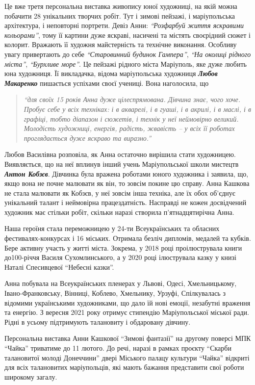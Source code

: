 
Це вже третя персональна виставка живопису юної художниці, на якій можна
побачити 28 унікальних творчих робіт. Тут і зимові пейзажі, і маріупольська
архітектура, і неповторні портрети. Девіз Анни: \emph{\enquote{Розфарбуй життя
яскравими кольорами}}, тому її картини дуже яскраві, насичені та містять
своєрідний сюжет і колорит. Вражають її художня майстерність та технічне
виконання. Особливу увагу привертають до себе \emph{\enquote{Старовинний
будинок Гампера}}, \emph{\enquote{На околиці рідного міста}},
\emph{\enquote{Бурхливе море}}. Це пейзажі рідного міста Маріуполь, яке дуже
любить юна художниця.  Її викладачка, відома маріупольська художниця
\emph{\textbf{Любов Макаренко}} пишається успіхами своєї учениці. Вона
наголосила, що

\begin{quote}
\em\enquote{для своїх 15 років Анна
дуже цілеспрямована. Дівчина знає, чого хоче. Пробує себе у всіх техніках: і в
акварелі, і в гуаші, і в акрилі, і в маслі, і в графіці, тобто діапазон і
сюжетів, і технік у неї неймовірно великий. Молодість художниці, енергія,
радість, жвавість – у всіх її роботах проглядається дуже яскраво та виразно.}
\end{quote}

Любов Василівна розповіла, як Анна остаточно вирішила стати художницею.
Виявляється, що на неї вплинув інший учень Маріупольської школи мистецтв \emph{\textbf{Антон
Кобзєв}}. Дівчинка була вражена роботами юного художника і заявила, що, якщо вона
не почне малювати як він, то зовсім покине цю справу. Анна Кашкова не стала
малювати як Кобзєв, у неї зовсім інша техніка, але їх обох об'єднує унікальний
талант і неймовірна працездатність. Насправді не кожен досвідчений художник має
стільки робіт, скільки наразі створила п'ятнадцятирічна Анна.


Наша героїня стала переможницею у 24-ти Всеукраїнських та обласних
фестивалях-конкурсах і 16 міських. Отримала безліч дипломів, медалей та кубків.
Бере активну участь у житті міста. Зокрема, у 2018 році проілюструвала книги
до100-річчя Василя Сухомлинського, а у 2020 році  ілюструвала казку у книзі
Наталі Спесивцевої \enquote{Небесні казки}.

Анна побувала на Всеукраїнських пленерах у Львові, Одесі, Хмельницькому,
Івано-Франковську, Вінниці, Коблево, Хмельнику, Урзуфі, Спілкувалась з відомими
українськими художниками, що дало їй нові емоції, незабутні враження та
енергію. З вересня 2021 року отримує стипендію Маріупольської міської ради.
Рідні в усьому підтримують талановиту і обдаровану дівчину.

Персональна виставка Анни Кашкової \enquote{Зимові фантазії} на другому поверсі МПК
\enquote{Чайка} триватиме до 11 лютого. До речі, наразі в рамках проєкту \enquote{Скарби
талановитої молоді Донеччини} двері Міського палацу культури \enquote{Чайка} відкриті
для всіх талановитих маріупольців, які мають бажання представити свої роботи
широкому загалу.

